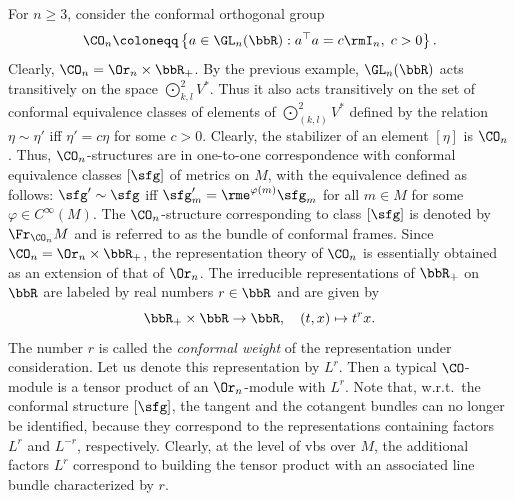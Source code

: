 \begin{example}
    For $n\geq 3$, consider the conformal orthogonal group 
    \[\CO_n\coloneqq \left\{a\in\GL_n(\bbR):a^\top a=c\rmI_n,\; c>0\right\}.\]
    Clearly, $\CO_n=\Or_n\times\bbR_+$. By the previous example, $\GL_n(\bbR)$ acts transitively on the space $\bigodot\nolimits^2_{k,l}V^\ast$. Thus it also acts transitively on the set of conformal equivalence classes of elements of $\bigodot\nolimits^2_{(k,l)}V^\ast$ defined by the relation $\eta\sim\eta'$ iff $\eta'=c\eta$ for some $c>0$. Clearly, the stabilizer of an element $[\eta]$ is $\CO_n$. Thus, $\CO_n$-structures are in one-to-one correspondence with conformal equivalence classes $[\sfg]$ of metrics on $M$, with the equivalence defined as follows: $\sfg'\sim\sfg$ iff $\sfg'_m=\rme^{\varphi(m)}\sfg_m$ for all $m\in M$ for some $\varphi\in C^\infty(M)$. The $\CO_n$-structure corresponding to class $[\sfg]$ is denoted by $\Fr_{\CO_n}M$ and is referred to as the bundle of conformal frames.
    Since $\CO_n=\Or_n\times\bbR_+$, the representation theory of $\CO_n$ is essentially obtained as an extension of that of $\Or_n$. The irreducible representations of $\bbR_+$ on $\bbR$ are labeled by real numbers $r\in\bbR$ and are given by 
    \[\bbR_+\times\bbR\to \bbR,\quad (t,x)\mapsto t^r x.\]
    The number $r$ is called the \emph{conformal weight} of the representation under consideration. Let us denote this representation by $L^r$. Then a typical $\CO$-module is a tensor product of an $\Or_n$-module with $L^r$. Note that, w.r.t.\ the conformal structure $[\sfg]$, the tangent and the cotangent bundles can no longer be identified, because they correspond to the representations containing factors $L^r$ and $L^{-r}$, respectively. Clearly, at the level of \glspl{vb} over $M$, the additional factors $L^r$ correspond to building the tensor product with an associated line bundle characterized by $r$.


\end{example}
